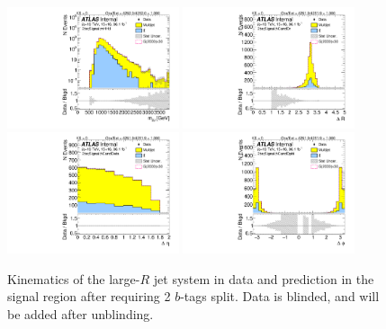 \begin{figure}[htbp!]
\begin{center}
\includegraphics[angle=270, width=0.45\textwidth]{./figures/boosted/Signal/b77_TwoTag_split_Signal_mHH_l_1_blind.pdf}
\includegraphics[angle=270, width=0.45\textwidth]{./figures/boosted/Signal/b77_TwoTag_split_Signal_hCandDr_blind.pdf}\\
\includegraphics[angle=270, width=0.45\textwidth]{./figures/boosted/Signal/b77_TwoTag_split_Signal_hCandDeta_blind.pdf}
\includegraphics[angle=270, width=0.45\textwidth]{./figures/boosted/Signal/b77_TwoTag_split_Signal_hCandDphi_blind.pdf}
  \caption{Kinematics of the large-$R$ jet system in data and prediction in the signal region after requiring 2 $b$-tags split. Data is blinded, and will be added after unblinding. }
  \label{fig:boosted-2bs-signal-blind-ak10-system}
\end{center}
\end{figure}

\clearpage



